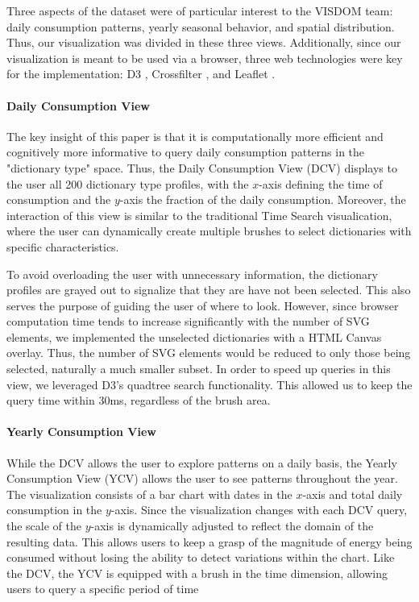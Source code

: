 \documentclass[letterpaper, 12 pt, conference]{ieeeconf}  %
\begin{document}





Three aspects of the dataset were of particular interest to the VISDOM team: daily consumption patterns, yearly seasonal behavior, and spatial distribution. Thus, our visualization was divided in these three views. Additionally, since our visualization is meant to be used via a browser, three web technologies were key for the implementation: D3 \cite{2011-d3}, Crossfilter \cite{crossfilter}, and Leaflet \cite{leaflet}.

\paragraph{Daily Consumption View} The key insight of this paper is that it is computationally more efficient and cognitively more informative to query daily consumption patterns in the "dictionary type" space. Thus, the Daily Consumption View (DCV) displays to the user all 200 dictionary type profiles, with the $x$-axis defining the time of consumption and the $y$-axis the fraction of the daily consumption. Moreover, the interaction of this view is similar to the traditional Time Search \cite{hochheiser2001interactive} visualication, where the user can dynamically create multiple brushes to select dictionaries with specific characteristics. 

To avoid overloading the user with unnecessary information, the dictionary profiles are grayed out to signalize that they are have not been selected. This also serves the purpose of guiding the user of where to look. However, since browser computation time tends to increase significantly with the number of SVG elements, we implemented the unselected dictionaries with a HTML Canvas overlay. Thus, the number of SVG elements would be reduced to only those being selected, naturally a much smaller subset. In order to speed up queries in this view, we leveraged D3's quadtree search functionality. This allowed us to keep the query time within 30ms, regardless of the brush area. 

\paragraph{Yearly Consumption View} While the DCV allows the user to explore patterns on a daily basis, the Yearly Consumption View (YCV) allows the user to see patterns throughout the year. The visualization consists of a bar chart with dates in the $x$-axis and total daily consumption in the $y$-axis. Since the visualization changes with each DCV query, the scale of the $y$-axis is dynamically adjusted to reflect the domain of the resulting data. This allows users to keep a grasp of the magnitude of energy being consumed without losing the ability to detect variations within the chart. Like the DCV, the YCV is equipped with a brush in the time dimension, allowing users to query a specific period of time
\end{document}
